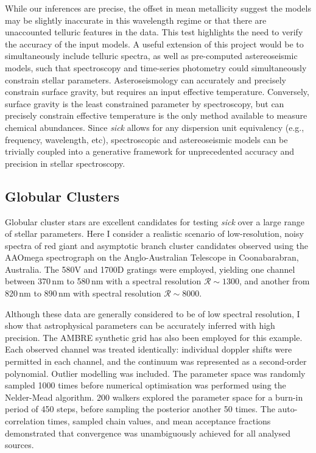 \documentclass{aastex}
\newcommand{\sick}{\textit{sick}}
\begin{document}
While our inferences are precise, the offset in mean metallicity suggest the models may be slightly inaccurate in this wavelength regime or that there are unaccounted telluric features in the data. This test highlights the need to verify the accuracy of the input models. A useful extension of this project would be to simultaneously include telluric spectra, as well as pre-computed astereoseismic models, such that spectroscopy and time-series photometry could simultaneously constrain stellar parameters. Asteroseismology can accurately and precisely constrain surface gravity, but requires an input effective temperature. Conversely, surface gravity is the least constrained parameter by spectroscopy, but can precisely constrain effective temperature is the only method available to measure chemical abundances. Since \sick{} allows for any dispersion unit equivalency (e.g., frequency, wavelength, etc), spectroscopic and astereoseismic models can be trivially coupled into a generative framework for unprecedented accuracy and precision in stellar spectroscopy.

\subsection{Globular Clusters}
Globular cluster stars are excellent candidates for testing \sick{} over a large range of stellar parameters. Here I consider a realistic scenario of low-resolution, noisy spectra of red giant and asymptotic branch cluster candidates observed using the AAOmega spectrograph on the Anglo-Australian Telescope in Coonabarabran, Australia. The 580V and 1700D gratings were employed, yielding one channel between 370\,nm to 580\,nm with a spectral resolution $\mathcal{R} \sim 1300$, and another from 820\,nm to 890\,nm with spectral resolution $\mathcal{R} \sim 8000$.

Although these data are generally considered to be of low spectral resolution, I show that astrophysical parameters can be accurately inferred with high precision. The AMBRE synthetic grid has also been employed for this example. Each observed channel was treated identically: individual doppler shifts were permitted in each channel, and the continuum was represented as a second-order polynomial. Outlier modelling was included.
The parameter space was randomly sampled 1000 times before numerical optimisation was performed using the Nelder-Mead algorithm. 200 walkers explored the parameter space for a burn-in period of 450 steps, before sampling the posterior another 50 times. The auto-correlation times, sampled chain values, and mean acceptance fractions demonstrated that convergence was unambiguously achieved for all analysed sources.
\end{document}
